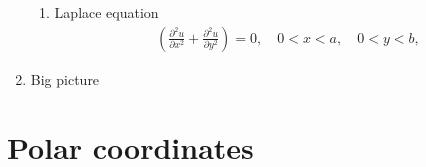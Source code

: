 \begin{enumerate}
\begin{enumerate}
    \item Laplace equation
    \begin{align*}
        & \left(\frac{\partial^{2} u}{\partial x^{2}} + \frac{\partial^{2} u}{\partial y^{2}}\right) = 0, \quad 0<x<a , \quad 0<y<b,
    \end{align*}
    \vspace{60pt}
    

\end{enumerate}

\newpage 
\item Big picture


\end{enumerate}

\vfill

\section{Polar coordinates}

